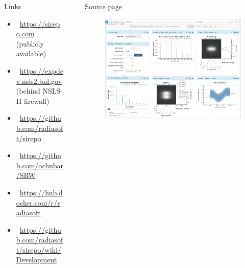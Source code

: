 \documentclass[final]{beamer}
\newlength{\sepwid}
\newlength{\onecolwid}
\newlength{\twocolwid}
\newcommand{\colorify}[1]{\textcolor{linkcolor}{#1}}
\newcommand{\mylinkn}[2]{\href{#1}{\colorify{#2}}}
\begin{document}
\begin{frame}[t]
\begin{columns}[t]
\begin{column}{\onecolwid}
\vspace{-1.2cm}
\begin{block}{\faLink{} Links}
\vspace{-0.5cm}
\begin{itemize}
  \item[\faCloud{}]~\mylinkn{https://sirepo.com/\#/srw}{https://sirepo.com} (publicly available)
  \item[\faCloud{}]~\mylinkn{https://expdev.nsls2.bnl.gov}{https://expdev.nsls2.bnl.gov} (behind NSLS-II firewall)
  \item[\faGithub{}]~\mylinkn{https://github.com/radiasoft/sirepo}{https://github.com/radiasoft/sirepo}
  \item[\faGithub{}]~\mylinkn{https://github.com/ochubar/SRW}{https://github.com/ochubar/SRW}
  \item[\faShip{}]~\mylinkn{https://hub.docker.com/r/radiasoft/sirepo/tags/}{https://hub.docker.com/r/radiasoft}
  \item[\faLaptop{}]~\mylinkn{https://github.com/radiasoft/sirepo/wiki/Development}{https://github.com/radiasoft/sirepo/wiki/Development}
\end{itemize}
\end{block}


\end{column} %




\begin{column}{\sepwid}\end{column} %
\begin{column}{\twocolwid} %

\begin{block}{\faLightbulbO{} Source page}
\vspace{-1.0cm}

\begin{figure}
\includegraphics[width=0.95\linewidth]{images/source_page.png}
\end{figure}


\end{block}
\end{column}
\end{columns}
\end{frame}
\end{document}
